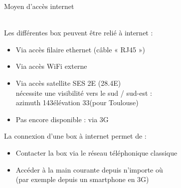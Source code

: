 \documentclass{beamer}
\begin{document}
\begin{frame}
    \begin{huge}Moyen d’accès internet\end{huge}
    \vspace{0.5cm}
    \\
    Les différentes box peuvent être relié à internet :
    \begin{itemize}
        \item Via accès filaire ethernet (câble « RJ45 »)
        \item Via accès WiFi externe
        \item Via accès satellite SES 2E (28.4\degre E)\\
            nécessite une visibilité vers le sud / sud-est :\\
            azimuth 143\degre élévation 33\degre (pour Toulouse)
        \item Pas encore disponible : via 3G
    \end{itemize}
    La connexion d’une box à internet permet de :
    \begin{itemize}
        \item Contacter la box via le réseau téléphonique classique
        \item Accéder à la main courante depuis n’importe où\\
            (par exemple depuis un smartphone en 3G)
    \end{itemize}
\end{frame}
\end{document}
